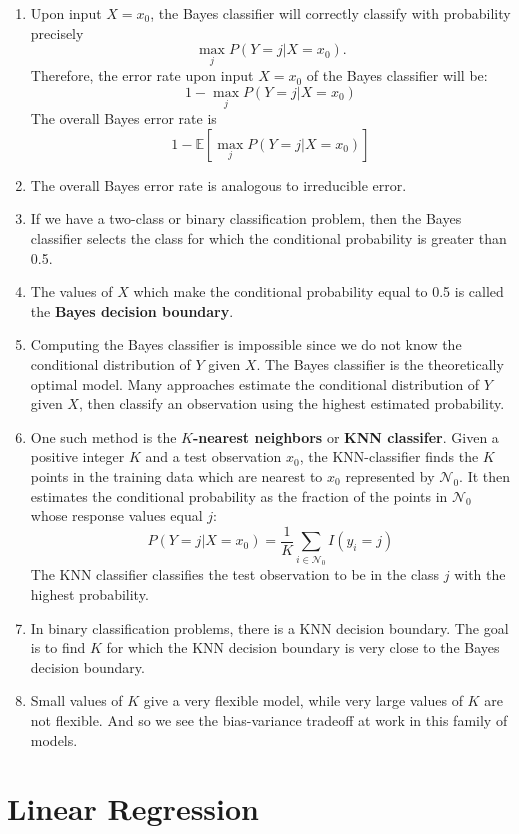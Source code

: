 \documentclass[10pt]{article}
\newcommand{\EE}{{\mathbb{E}}}
\begin{document}
\begin{enumerate}
\item Upon input $X = x_0$, the Bayes classifier will correctly classify with probability precisely $$\max_j P(Y = j | X = x_0).$$
Therefore, the error rate upon input $X = x_0$ of the Bayes classifier will be:
$$ 1 - \max_j P(Y = j | X = x_0)$$
The overall Bayes error rate is
$$ 1 - \EE\left[ \max_j P(Y = j | X = x_0) \right] $$
\item The overall Bayes error rate is analogous to irreducible error.
\item If we have a two-class or binary classification problem, then the Bayes classifier selects the class for which the conditional probability is greater than 0.5.
\item The values of $X$ which make the conditional probability equal to 0.5 is called the \textbf{Bayes decision boundary}.
\item Computing the Bayes classifier is impossible since we do not know the conditional distribution of $Y$ given $X$.  The Bayes classifier is the theoretically optimal model. Many approaches estimate the conditional distribution of $Y$ given $X$, then classify an observation using the highest estimated probability.  
\item One such method is the \textbf{$K$-nearest neighbors} or \textbf{KNN classifer}. Given a positive integer $K$ and a test observation $x_0$, the KNN-classifier finds the $K$ points in the training data which are nearest to $x_0$ represented by $\mathcal{N}_0$.  It then estimates the conditional probability as the fraction of the points in $\mathcal{N}_0$ whose response values equal $j$:
$$P(Y = j | X = x_0) = \dfrac{1}{K} \sum_{i \in \mathcal{N}_0} I(y_i = j) $$
The KNN classifier classifies the test observation  to be in the class $j$ with the highest probability.
\item In binary classification problems, there is a KNN decision boundary.  The goal is to find $K$ for which the KNN decision boundary is very close to the Bayes decision boundary.  
\item Small values of $K$ give a very flexible model, while very large values of $K$ are not flexible.  And so we see the bias-variance tradeoff at work in this family of models.
\end{enumerate}

\section{Linear Regression} 
\end{document}
